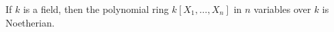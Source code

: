 If $k$ is a field, then the polynomial ring $k[X_1, \ldots, X_n]$ in $n$ variables over $k$ is Noetherian.
